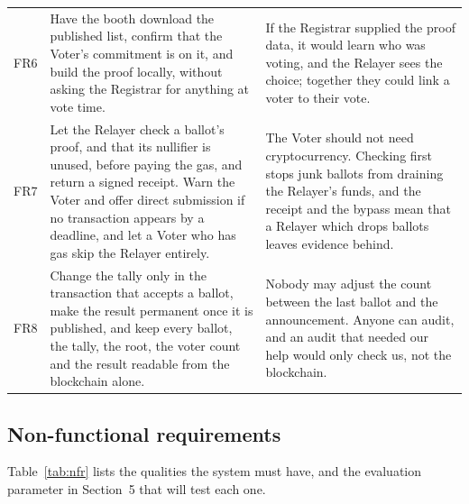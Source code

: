 \begin{longtable}{@{}>{\RaggedRight\arraybackslash\small}p{1.3cm}>{\RaggedRight\arraybackslash\small}p{8.1cm}>{\RaggedRight\arraybackslash\small}p{7.9cm}@{}}
  \addlinespace[2pt]
  FR6 & Have the booth download the published list, confirm that the Voter's commitment is on it, and build the proof locally, without asking the Registrar for anything at vote time. & If the Registrar supplied the proof data, it would learn who was voting, and the Relayer sees the choice; together they could link a voter to their vote. \\
  \addlinespace[2pt]
  FR7 & Let the Relayer check a ballot's proof, and that its nullifier is unused, before paying the gas, and return a signed receipt. Warn the Voter and offer direct submission if no transaction appears by a deadline, and let a Voter who has gas skip the Relayer entirely. & The Voter should not need cryptocurrency. Checking first stops junk ballots from draining the Relayer's funds, and the receipt and the bypass mean that a Relayer which drops ballots leaves evidence behind. \\
  \addlinespace[2pt]
  FR8 & Change the tally only in the transaction that accepts a ballot, make the result permanent once it is published, and keep every ballot, the tally, the root, the voter count and the result readable from the blockchain alone. & Nobody may adjust the count between the last ballot and the announcement. Anyone can audit, and an audit that needed our help would only check us, not the blockchain. \\
\end{longtable}

\subsection{Non-functional requirements}

Table~\ref{tab:nfr} lists the qualities the system must have, and the
evaluation parameter in Section~5 that will test each one.


